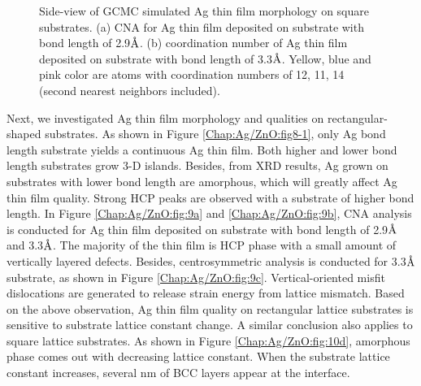 \begingroup
\begin{figure}[!ht]
  \centering
  \label{Chap:Ag/ZnO:fig:10g}
  \label{Chap:Ag/ZnO:fig:10h}
\caption[Side-view of \ac{GCMC} simulated Ag thin film morphology on square substrates.]{Side-view of \ac{GCMC} simulated Ag thin film morphology on square substrates. (a) \ac{CNA} for Ag thin film deposited on substrate with bond length of 2.9$\mbox{\normalfont\AA}$. (b) coordination number of Ag thin film deposited on substrate with bond length of 3.3$\mbox{\normalfont\AA}$. Yellow, blue and pink color are atoms with coordination numbers of 12, 11, 14 (second nearest neighbors included).}
  \label{Chap:Ag/ZnO:fig10-3}
\end{figure}
\endgroup

Next, we investigated Ag thin film morphology and qualities on rectangular-shaped substrates. As shown in Figure \ref{Chap:Ag/ZnO:fig8-1}, only Ag bond length substrate yields a continuous Ag thin film. Both higher and lower bond length substrates grow 3-D islands. Besides, from \ac{XRD} results, Ag grown on substrates with lower bond length are amorphous, which will greatly affect Ag thin film quality. Strong \ac{HCP} peaks are observed with a substrate of higher bond length. In Figure \ref{Chap:Ag/ZnO:fig:9a} and \ref{Chap:Ag/ZnO:fig:9b}, \ac{CNA} analysis is conducted for Ag thin film deposited on substrate with bond length of 2.9$\mbox{\normalfont\AA}$ and 3.3$\mbox{\normalfont\AA}$. The majority of the thin film is \ac{HCP} phase with a small amount of vertically layered defects. Besides, centrosymmetric analysis is conducted for 3.3$\mbox{\normalfont\AA}$ substrate, as shown in Figure \ref{Chap:Ag/ZnO:fig:9c}. Vertical-oriented misfit dislocations are generated to release strain energy from lattice mismatch. Based on the above observation, Ag thin film quality on rectangular lattice substrates is sensitive to substrate lattice constant change. A similar conclusion also applies to square lattice substrates. As shown in Figure \ref{Chap:Ag/ZnO:fig:10d}, amorphous phase comes out with decreasing lattice constant. When the substrate lattice constant increases, several nm of \ac{BCC} layers appear at the interface. 

